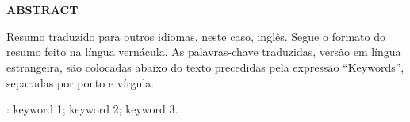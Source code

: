 \chapter*{}
\vspace{-4cm}
\begin{center}
 \textbf{ABSTRACT}
\end{center}
\vspace{0.5cm}

\noindent Resumo traduzido para outros idiomas, neste caso, inglês. Segue o formato do resumo feito na língua vernácula. As palavras-chave traduzidas, versão em língua estrangeira, são colocadas abaixo do texto precedidas pela expressão “Keywords”, separadas por ponto e vírgula.

\vspace{1cm}

: keyword 1; keyword 2; keyword 3.

